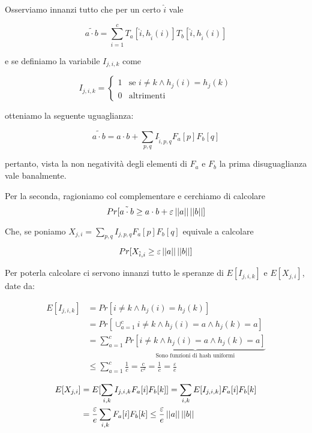 \begin{proof*}
Osserviamo innanzi tutto che per un certo $\hat{i}$ vale

\[
    \tilde{a \cdot b} = \sum_{i=1}^c T_a[\hat{i}, h_{\hat{i}}(i)] T_b[\hat{i}, h_{\hat{i}}(i)]
\]

e se definiamo la variabile $I_{j, i, k}$ come

\[
    I_{j, i, k} =
    \begin{cases}
        1 & \mbox{se } i \neq k \land h_j(i) = h_j(k) \\
        0 & \mbox{altrimenti}
    \end{cases}
\]

otteniamo la seguente uguaglianza:

\[
    \tilde{a \cdot b} = a \cdot b + \sum_{p, q} I_{\hat{i}, p, q} F_a[p] F_b[q]
\]

pertanto, vista la non negatività degli elementi di $F_a$ e $F_b$ la prima
disuguaglianza vale banalmente.

Per la seconda, ragioniamo col complementare e cerchiamo di calcolare
\[ Pr[\tilde{a \cdot b} \ge a \cdot b + \varepsilon \left|\left|a\right|\right|\left|\left|b\right|\right|] \]

Che, se poniamo $X_{j, i} = \sum_{p, q} I_{j, p, q} F_a[p] F_b[q]$ equivale a calcolare

\[ Pr[X_{\hat{i}, i} \ge \varepsilon \left|\left|a\right|\right|\left|\left|b\right|\right|] \]

Per poterla calcolare ci servono innanzi tutto le speranze di $E[I_{j, i, k}]$
e $E[X_{j,i}]$, date da:

\begin{align*}
    E[I_{j, i, k}] &= Pr\left[i \neq k \land h_j(i) = h_j(k)\right] \\ 
    &= Pr\left[\cup_{a=1}^c i \neq k \land h_j(i) = a \land h_j(k) = a \right] \\
    &= \sum_{a=1}^c \underbrace{Pr\left[i \neq k \land h_j(i) = a \land h_j(k) = a \right]}_
        {\mbox{Sono funzioni di hash uniformi}}\\
    &\le \sum_{a=1}^c \frac{1}{c} = \frac{c}{c^2} = \frac{1}{c} = \frac{\varepsilon}{e}
\end{align*}

\begin{align*}
    E[X_{j, i}] &= E[\sum_{i, k} I_{j, i, k} F_a[i] F_b[k]] 
    = \sum_{i, k} E[I_{j, i, k}] F_a[i] F_b[k] \\
    &= \frac{\varepsilon}{e} \sum_{i, k} F_a[i]F_b[k]
    \le \frac{\varepsilon}{e} \left|\left|a\right|\right|\left|\left|b\right|\right|
\end{align*}


\end{proof*}
